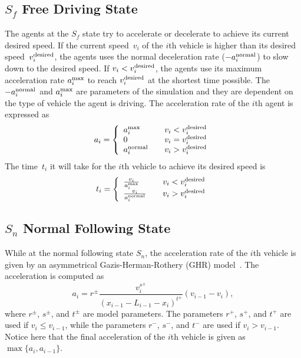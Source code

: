 \documentclass[preprint]{./acm_proc_article-sp}
\begin{document}
\subsection{$S_f$ Free Driving State}

The agents at the $S_f$ state try to accelerate or decelerate to achieve its current desired speed. If the current speed~$v_i$ of the $i$th vehicle is higher than its desired speed~$v_i^{\rm desired}$, the agents uses the normal deceleration rate ($-a_i^{\rm normal}$) to slow down to the desired speed. If  $v_i < v_i^{\rm desired}$, the agents use its maximum acceleration rate $a_i^{\rm max}$ to reach $v_i^{\rm desired}$ at the shortest time possible. The $-a_i^{\rm normal}$ and $a_i^{\rm max}$ are parameters of the simulation and they are dependent on the type of vehicle the agent is driving. The acceleration rate of the $i$th agent is expressed as
$$
  a_i = \left\{\begin{array}{ll} a_i^{\rm max} & \quad v_i < v_i^{\rm desired}\\
                                  0           & \quad v_i = v_i^{\rm desired}\\
                                a_i^{\rm normal} &  \quad v_i > v_i^{\rm desired}\end{array} \right.
$$
The time~$t_i$ it will take for the $i$th vehicle to achieve its desired speed is
$$
  t_i = \left\{\begin{array}{ll}
                  \frac{v_i}{a_i^{\rm max}} & \quad v_i < v_i^{\rm desired}\\
                  \frac{v_i}{a_i^{\rm normal}} & \quad v_i > v_i^{\rm desired}
               \end{array}\right.
$$
\subsection{$S_n$ Normal Following State}

While at the normal following state $S_n$, the acceleration rate of the $i$th vehicle is given by an asymmetrical Gazis-Herman-Rothery (GHR) model~\citep{chandler58,gazis61,yang96}. The acceleration is computed as
$$
    a_i = r^{\pm}\frac{v_i^{s^{\pm}}}{(x_{i-1}-L_{i-1}-x_i)^{t^{\pm}}}(v_{i-1}-v_i),
$$
where $r^{\pm}$, $s^{\pm}$, and $t^{\pm}$ are model parameters. The parameters $r^+$, $s^+$, and $t^+$ are used if $v_i\le v_{i-1}$, while the parameters $r^-$, $s^-$, and $t^-$ are used if $v_i > v_{i-1}$. Notice here that the final acceleration of the $i$th vehicle is given as $\max\{a_i, a_{i-1}\}$.
\end{document}

